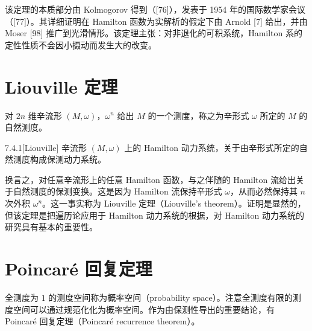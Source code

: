 该定理的本质部分由 Kolmogorov 得到（[76]），发表于 1954 年的国际数学家会议（[77]）。其详细证明在 Hamilton 函数为实解析的假定下由 Arnold [7] 给出，并由 Moser [98] 推广到光滑情形。该定理主张：对非退化的可积系统，Hamilton 系的定性性质不会因小摄动而发生大的改变。



\section{Liouville 定理}

对 $2n$ 维辛流形 $(M,\omega)$，$\omega^n$ 给出 $M$ 的一个测度，称之为辛形式 $\omega$ 所定的 $M$ 的自然测度。

\begin{theorem}{7.4.1}[Liouville]
辛流形 $(M,\omega)$ 上的 Hamilton 动力系统，关于由辛形式所定的自然测度构成保测动力系统。
\end{theorem}

换言之，对任意辛流形上的任意 Hamilton 函数，与之伴随的 Hamilton 流给出关于自然测度的保测变换。这是因为 Hamilton 流保持辛形式 $\omega$，从而必然保持其 $n$ 次外积 $\omega^n$。这一事实称为 Liouville 定理（Liouville's theorem）。证明是显然的，但该定理是把遍历论应用于 Hamilton 动力系统的根据，对 Hamilton 动力系统的研究具有基本的重要性。



\section{Poincaré 回复定理}

全测度为 $1$ 的测度空间称为概率空间（probability space）。注意全测度有限的测度空间可以通过规范化化为概率空间。作为由保测性导出的重要结论，有 Poincaré 回复定理（Poincaré recurrence theorem）。


